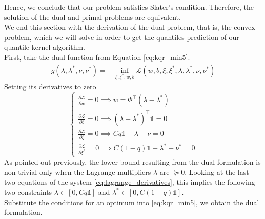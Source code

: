 Hence, we conclude that our problem satisfies Slater's condition. Therefore, the solution of the dual and primal problems are equivalent.
\\
We end this section with the derivation of the dual problem, that is, the convex problem, which we will solve in order to get the quantiles prediction of our quantile kernel algorithm.
\\
First, take the dual function from Equation \ref{eq:kqr_min5}.
\begin{equation}
    \begin{aligned}
        g(\lambda, \lambda^*, \nu, \nu^*)= & \inf_{\xi, \xi^*, w, b} \mathcal{L}(w,b,\xi,\xi^*,\lambda, \lambda^*, \nu, \nu^*)
\end{aligned}
\end{equation}
Setting its derivatives to zero
\begin{equation}\label{eq:lagrange_derivatives}
    \begin{cases}
        \frac{\partial \mathcal{L}}{\partial w}=0 \implies w=\Phi^\intercal(\lambda-\lambda^*)
        \\
        \frac{\partial \mathcal{L}}{\partial b}=0 \implies (\lambda-\lambda^*)^\intercal\mathbb{1}=0
        \\
        \frac{\partial \mathcal{L}}{\partial \xi}=0 \implies Cq \mathbb{1}-\lambda- \nu=0
        \\
        \frac{\partial \mathcal{L}}{\partial \xi^*}=0 \implies C(1-q)\mathbb{1} -\lambda^* -\nu^*=0
    \end{cases}
\end{equation}
As pointed out previously, the lower bound resulting from the dual formulation is non trivial only when the Lagrange multipliers $\lambda$ are $\succeq 0$. Looking at the last two equations of the system \ref{eq:lagrange_derivatives}, this implies the following two constraints $\lambda \in [0, Cq\mathbb{1}]$ and $\lambda^*\in [0, C(1-q)\mathbb{1}]$.
\\
Substitute the conditions for an optimum into \ref{eq:kqr_min5}, we obtain the dual formulation.
